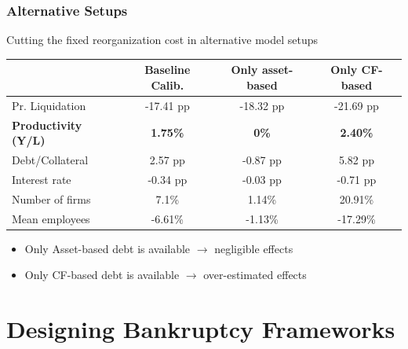 \documentclass[aspectratio=169,xcolor=table]{beamer}
\begin{document}
\begin{frame}[label=Aggeffects] \frametitle{Alternative Setups \hfill  \hyperlink{liqrisk}{}}

Cutting the fixed reorganization cost in alternative model setups

\small
\begin{table}[H]
    \centering
    \renewcommand{\arraystretch}{0.85}
    \begin{tabular}{lccc}
    & \textbf{Baseline Calib.} & \textbf{Only asset-based} & \textbf{Only CF-based} \\    
    \toprule
    Pr. Liquidation & -17.41 pp & -18.32 pp & -21.69 pp \\  
    \textbf{Productivity (Y/L)}  & \textbf{1.75\%} & \textbf{0\%} & \textbf{2.40\%} \vspace{2mm} \\  

    Debt/Collateral & 2.57 pp & -0.87 pp & 5.82 pp \\  
    Interest rate & -0.34 pp & -0.03 pp & -0.71 pp \\  
    Number of firms & 7.1\% & 1.14\% & 20.91\% \\  
    Mean employees & -6.61\% & -1.13\% & -17.29\% \\  
    \bottomrule
    \end{tabular}
    \label{tab:percentage_changes}
\end{table}
\normalsize

\begin{itemize} 
    \item Only Asset-based debt is available $\rightarrow$ negligible effects
    \item Only CF-based debt is available $\rightarrow$ over-estimated effects
\end{itemize} 


\end{frame}


\section{Designing Bankruptcy Frameworks}
\end{document}
